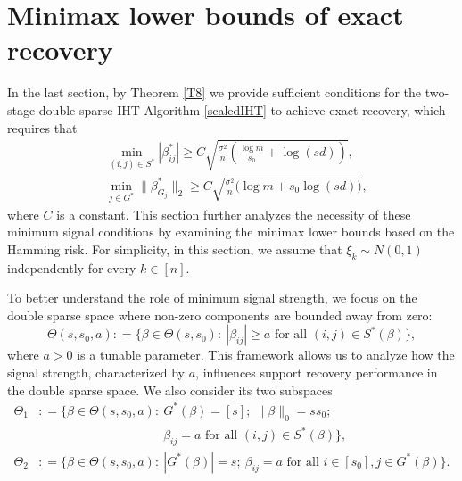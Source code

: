 \documentclass[12pt]{article}
\begin{document}
\section{Minimax lower bounds of exact recovery}\label{sec:lower}

In the last section, by Theorem \ref{T8} we provide sufficient conditions for the two-stage double sparse IHT Algorithm \ref{scaledIHT} to achieve exact recovery, which requires that
\begin{equation}\label{eq: uppercondition}
\begin{aligned}
    &\min_{(i,j) \in S^*} |\beta^*_{ij}| \geq C \sqrt{\frac{\sigma^2}{n} \left( \frac{\log m}{s_0} + \log(sd) \right)}, \\
    &\min_{j \in G^*} \|\beta^*_{G_j}\|_2 \geq C \sqrt{\frac{\sigma^2}{n} \big(  \log m + s_0 \log(sd) \big)},
\end{aligned}
\end{equation}
where $C$ is a constant. 
This section further analyzes the necessity of these minimum signal conditions by examining the minimax lower bounds based on the Hamming risk.
For simplicity, in this section, we assume that $\xi_{k} \sim N(0,1)$ independently for every $ k \in [n]$.


To better understand the role of minimum signal strength, we focus on the double sparse space where non-zero components are bounded away from zero:
\begin{equation}\label{omega}  
{\Theta}(s,s_0,a): = \big\{ \beta \in {\Theta}(s,s_0):~ | \beta_{ij} | \ge a  \text{  for all } (i,j) \in S^*(\beta) \big\},  
\end{equation}  
where $a > 0$ is a tunable parameter.
This framework allows us to analyze how the signal strength, characterized by $a$, influences support recovery performance in the double sparse space.
We also consider its two subspaces 
\begin{equation}
\begin{aligned}
{\Theta}_1 &: = \Big\{\beta \in {\Theta}(s,s_0,a):  
~ G^*(\beta ) = [s]; ~ \| \beta\|_0 = ss_0;\\
 &\qquad\qquad\qquad\qquad\qquad \beta_{ij} = a \text{  for all } (i,j) \in S^*(\beta) \Big\},\\
{\Theta}_2&: = \Big\{{\beta} \in {\Theta}(s,s_0,a): 
~ |G^*(\beta)| = s;~ \beta_{ij} =a  \text{  for all }  i \in [s_0], j \in G^*(\beta) \Big\}.
\end{aligned}
\end{equation}
\end{document}
